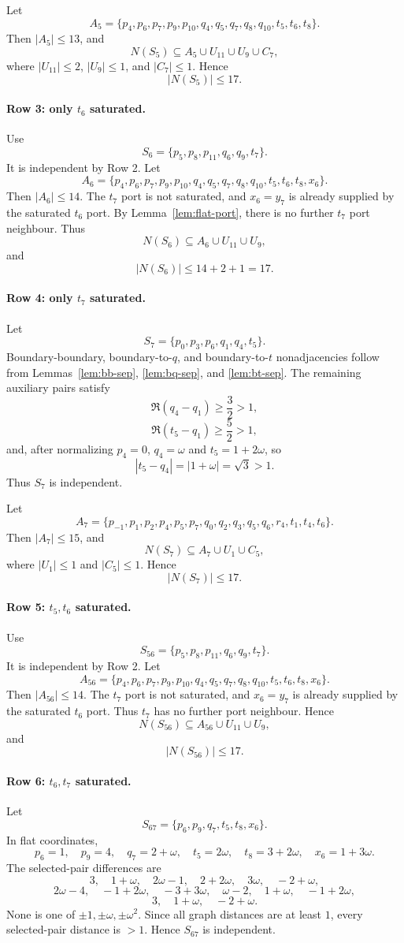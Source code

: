 \documentclass[11pt]{article}
\begin{document}
Let
\[
A_5=\{p_4,p_6,p_7,p_9,p_{10},q_4,q_5,q_7,q_8,q_{10},t_5,t_6,t_8\}.
\]
Then $|A_5|\le13$, and
\[
N(S_5)\subseteq A_5\cup U_{11}\cup U_9\cup C_7,
\]
where $|U_{11}|\le2$, $|U_9|\le1$, and $|C_7|\le1$. Hence
\[
  |N(S_5)|\le17.
\]

\paragraph{Row 3: only $t_6$ saturated.}
Use
\[
  S_6=\{p_5,p_8,p_{11},q_6,q_9,t_7\}.
\]
It is independent by Row 2. Let
\[
A_6=\{p_4,p_6,p_7,p_9,p_{10},q_4,q_5,q_7,q_8,q_{10},t_5,t_6,t_8,x_6\}.
\]
Then $|A_6|\le14$. The $t_7$ port is not saturated, and $x_6=y_7$ is already supplied by the saturated $t_6$ port. By Lemma~\ref{lem:flat-port}, there is no further $t_7$ port neighbour. Thus
\[
N(S_6)\subseteq A_6\cup U_{11}\cup U_9,
\]
and
\[
  |N(S_6)|\le14+2+1=17.
\]

\paragraph{Row 4: only $t_7$ saturated.}
Let
\[
  S_7=\{p_0,p_3,p_6,q_1,q_4,t_5\}.
\]
Boundary-boundary, boundary-to-$q$, and boundary-to-$t$ nonadjacencies follow from Lemmas~\ref{lem:bb-sep}, \ref{lem:bq-sep}, and \ref{lem:bt-sep}. The remaining auxiliary pairs satisfy
\[
\Re(q_4-q_1)\ge\frac32>1,
\]
\[
\Re(t_5-q_1)\ge\frac52>1,
\]
and, after normalizing $p_4=0$, $q_4=\omega$ and $t_5=1+2\omega$, so
\[
  |t_5-q_4|=|1+\omega|=\sqrt3>1.
\]
Thus $S_7$ is independent.

Let
\[
A_7=\{p_{-1},p_1,p_2,p_4,p_5,p_7,q_0,q_2,q_3,q_5,q_6,r_4,t_1,t_4,t_6\}.
\]
Then $|A_7|\le15$, and
\[
N(S_7)\subseteq A_7\cup U_1\cup C_5,
\]
where $|U_1|\le1$ and $|C_5|\le1$. Hence
\[
  |N(S_7)|\le17.
\]

\paragraph{Row 5: $t_5,t_6$ saturated.}
Use
\[
  S_{56}=\{p_5,p_8,p_{11},q_6,q_9,t_7\}.
\]
It is independent by Row 2. Let
\[
A_{56}=\{p_4,p_6,p_7,p_9,p_{10},q_4,q_5,q_7,q_8,q_{10},t_5,t_6,t_8,x_6\}.
\]
Then $|A_{56}|\le14$. The $t_7$ port is not saturated, and $x_6=y_7$ is already supplied by the saturated $t_6$ port. Thus $t_7$ has no further port neighbour. Hence
\[
N(S_{56})\subseteq A_{56}\cup U_{11}\cup U_9,
\]
and
\[
  |N(S_{56})|\le17.
\]

\paragraph{Row 6: $t_6,t_7$ saturated.}
Let
\[
  S_{67}=\{p_6,p_9,q_7,t_5,t_8,x_6\}.
\]
In flat coordinates,
\[
  p_6=1,
  \quad p_9=4,
  \quad q_7=2+\omega,
  \quad t_5=2\omega,
  \quad t_8=3+2\omega,
  \quad x_6=1+3\omega.
\]
The selected-pair differences are
\[
3,
\quad 1+\omega,
\quad 2\omega-1,
\quad 2+2\omega,
\quad 3\omega,
\quad -2+\omega,
\]
\[
2\omega-4,
\quad -1+2\omega,
\quad -3+3\omega,
\quad \omega-2,
\quad 1+\omega,
\quad -1+2\omega,
\]
\[
3,
\quad 1+\omega,
\quad -2+\omega.
\]
None is one of $\pm1,\pm\omega,\pm\omega^2$. Since all graph distances are at least $1$, every selected-pair distance is $>1$. Hence $S_{67}$ is independent.
\end{document}
